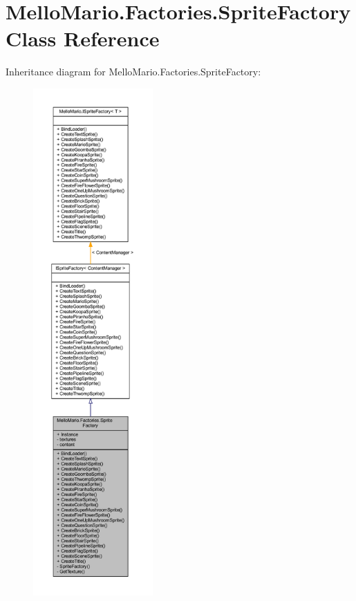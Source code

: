 \section{Mello\+Mario.\+Factories.\+Sprite\+Factory Class Reference}
\label{classMelloMario_1_1Factories_1_1SpriteFactory}


Inheritance diagram for Mello\+Mario.\+Factories.\+Sprite\+Factory\+:
\nopagebreak
\begin{figure}[H]
\begin{center}
\leavevmode
\includegraphics[height=550pt]{classMelloMario_1_1Factories_1_1SpriteFactory__inherit__graph}
\end{center}
\end{figure}


